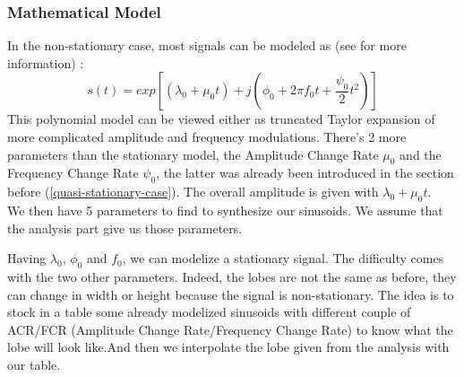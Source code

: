 \documentclass[]{article}
\begin{document}
\subsubsection{Mathematical Model}\label{mathematical model}
\hspace{15pt} In the non-stationary case, most signals can be modeled as  (see \cite{analysis-general} for more information) :
\begin{equation}
s(t) = exp[(\lambda_0 + \mu_0 t) + j(\phi_0 + 2\pi f_0 t + \frac{\psi_0}2 t^2 )]
\end{equation}
This polynomial model can be viewed either as truncated Taylor expansion of more complicated amplitude and frequency modulations. There's 2 more parameters than the stationary model, the Amplitude Change Rate $\mu_0$ and the Frequency Change Rate  $\psi_0$, the latter was already been introduced in the section before (\ref{quasi-stationary-case}). The overall amplitude is given with $\lambda_0 + \mu_0 t$. \\
We then have 5 parameters to find to synthesize our sinusoids. We assume that the analysis part give us those parameters. \par
Having $\lambda_0$, $\phi_0$ and $f_0$, we can modelize a stationary signal. The difficulty comes with the two other parameters. Indeed, the lobes are not the same as before, they can change in width or height because the signal is non-stationary. The idea is to stock in a table some already modelized sinusoids with different couple of ACR/FCR (Amplitude Change Rate/Frequency Change Rate) to know what the lobe will look like.And then we interpolate the lobe given from the analysis with our table.
\end{document}
